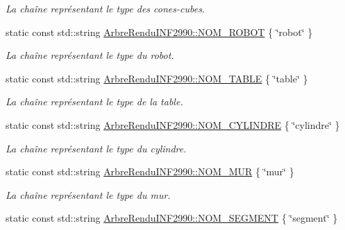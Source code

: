 \begin{DoxyCompactItemize}
\begin{DoxyCompactList}\small\item\em La chaîne représentant le type des cones-\/cubes. \end{DoxyCompactList}\item 
\hypertarget{group__inf2990_ga9a6799aa8903b858929bf675e4468aac}{static const std\-::string \hyperlink{group__inf2990_ga9a6799aa8903b858929bf675e4468aac}{Arbre\-Rendu\-I\-N\-F2990\-::\-N\-O\-M\-\_\-\-R\-O\-B\-O\-T} \{ \char`\"{}robot\char`\"{} \}}\label{group__inf2990_ga9a6799aa8903b858929bf675e4468aac}

\begin{DoxyCompactList}\small\item\em La chaîne représentant le type du robot. \end{DoxyCompactList}\item 
\hypertarget{group__inf2990_ga89e651c1a28481ce70f473bd15555114}{static const std\-::string \hyperlink{group__inf2990_ga89e651c1a28481ce70f473bd15555114}{Arbre\-Rendu\-I\-N\-F2990\-::\-N\-O\-M\-\_\-\-T\-A\-B\-L\-E} \{ \char`\"{}table\char`\"{} \}}\label{group__inf2990_ga89e651c1a28481ce70f473bd15555114}

\begin{DoxyCompactList}\small\item\em La chaîne représentant le type de la table. \end{DoxyCompactList}\item 
\hypertarget{group__inf2990_gae74e1de66e37dee6ef6cb6df82424c0d}{static const std\-::string \hyperlink{group__inf2990_gae74e1de66e37dee6ef6cb6df82424c0d}{Arbre\-Rendu\-I\-N\-F2990\-::\-N\-O\-M\-\_\-\-C\-Y\-L\-I\-N\-D\-R\-E} \{ \char`\"{}cylindre\char`\"{} \}}\label{group__inf2990_gae74e1de66e37dee6ef6cb6df82424c0d}

\begin{DoxyCompactList}\small\item\em La chaîne représentant le type du cylindre. \end{DoxyCompactList}\item 
\hypertarget{group__inf2990_ga4d9c8c9bfa165dde522834dec2882039}{static const std\-::string \hyperlink{group__inf2990_ga4d9c8c9bfa165dde522834dec2882039}{Arbre\-Rendu\-I\-N\-F2990\-::\-N\-O\-M\-\_\-\-M\-U\-R} \{ \char`\"{}mur\char`\"{} \}}\label{group__inf2990_ga4d9c8c9bfa165dde522834dec2882039}

\begin{DoxyCompactList}\small\item\em La chaîne représentant le type du mur. \end{DoxyCompactList}\item 
\hypertarget{group__inf2990_gaffe953e9369343040aa5d1b72510d810}{static const std\-::string \hyperlink{group__inf2990_gaffe953e9369343040aa5d1b72510d810}{Arbre\-Rendu\-I\-N\-F2990\-::\-N\-O\-M\-\_\-\-S\-E\-G\-M\-E\-N\-T} \{ \char`\"{}segment\char`\"{} \}}\label{group__inf2990_gaffe953e9369343040aa5d1b72510d810}


\end{DoxyCompactItemize}
